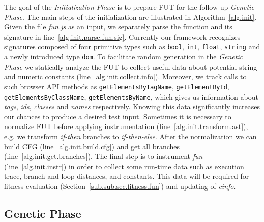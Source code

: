 \documentclass[sigconf]{acmart}
\begin{document}
The goal of the \emph{Initialization Phase} is to prepare FUT for the follow up \emph{Genetic Phase}. The main steps of the initialization are illustrated in Algorithm~\ref{alg.init}. Given the file \emph{fun.js} as an input, we separately parse the function and its signature in line~\ref{alg.init.parse.fun.sig}. Currently our framework recognizes signatures composed of four primitive types such as \texttt{bool}, \texttt{int}, \texttt{float}, \texttt{string} and a newly introduced type \texttt{dom}. To facilitate random generation in the \emph{Genetic Phase} we statically analyze the FUT to collect useful data about potential string and numeric constants (line~\ref{alg.init.collect.info}). Moreover, we track calls to such browser API methods as \texttt{getElementsByTagName}, \texttt{getElementById}, \texttt{getElementsByClassName}, \texttt{getElementsByName}, which gives us information about \emph{tags}, \emph{ids}, \emph{classes} and \emph{names} respectively. Knowing this data significantly increases our chances to produce a desired test input. Sometimes it is necessary to normalize FUT before applying instrumentation (line~\ref{alg.init.transform.ast}), e.g. we transform \emph{if-then} branches to \emph{if-then-else}. After the normalization we can build CFG (line~\ref{alg.init.build.cfg}) and get all branches (line~\ref{alg.init.get.branches}). The final step is to instrument \emph{fun} (line~\ref{alg.init.instr}) in order to collect some run-time data such as execution trace, branch and loop distances, and constants. This data will be required for fitness evaluation (Section~\ref{sub.sub.sec.fitness.fun}) and updating of \emph{cinfo}.

\subsection{Genetic Phase}
\label{sub.sec.genetic.phase}
\end{document}
